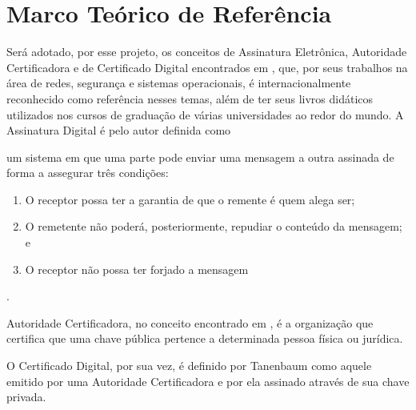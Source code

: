\chapter{Marco Teórico de Referência}
  \label{marcoteorico}

  Será adotado, por esse projeto, os conceitos de Assinatura
  Eletrônica, Autoridade Certificadora e de Certificado Digital
  encontrados em , que, por seus trabalhos na área
  de redes, segurança e sistemas operacionais, é
  internacionalmente reconhecido como referência nesses temas,
  além de ter seus livros didáticos utilizados nos cursos de
  graduação de várias universidades ao redor do mundo. A
  Assinatura Digital é pelo autor definida como

  \begin{citacao}um sistema em que uma parte pode enviar uma
  mensagem a outra assinada de forma a assegurar três condições:
  \begin{enumerate} \item O receptor possa ter a garantia de que
  o remente é quem alega ser; \item O remetente não poderá,
  posteriormente, repudiar o conteúdo da mensagem; e \item O
  receptor não possa ter forjado a mensagem\end {enumerate}
  \cite{ComputerNetworks}\end{citacao}.\par

  Autoridade Certificadora, no conceito encontrado em
  \cite{ComputerNetworks}, é a organização que certifica que
  uma chave pública pertence a determinada pessoa física ou
  jurídica.\par

  O Certificado Digital, por sua vez, é definido por Tanenbaum
  \nocite{ComputerNetworks} como aquele emitido por uma
  Autoridade Certificadora e por ela assinado através de sua
  chave privada.\par

  
